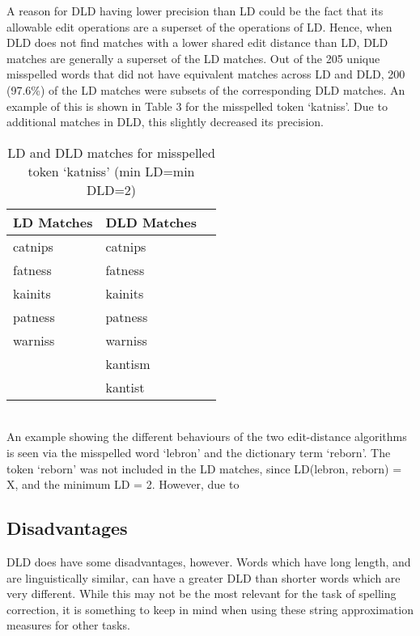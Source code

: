 \documentclass[11pt]{article}
\begin{document}
A reason for DLD having lower precision than LD could be the fact that its allowable edit operations are a superset of the operations of LD. Hence, when DLD does not find matches with a lower shared edit distance than LD, DLD matches are generally a superset of the LD matches. Out of the 205 unique misspelled words that did not have equivalent matches across LD and DLD, 200 (97.6\%) of the LD matches were subsets of the corresponding DLD matches. An example of this is shown in Table 3 for the misspelled token `katniss'. Due to additional matches in DLD, this slightly decreased its precision.
\begin{table}
\begin{center}
\begin{tabular}{ |l|l|l| }
\hline
LD Matches & DLD Matches \\
\hline
catnips & catnips\\
fatness & fatness\\ 
kainits & kainits\\
patness & patness\\
warniss & warniss\\
 & kantism\\
 & kantist\\
\hline
\end{tabular}
\caption{LD and DLD matches for misspelled token `katniss' (min LD=min DLD=2)}\label{table3}
\end{center}
\end{table}
\\

An example showing the different behaviours of the two edit-distance algorithms is seen via the misspelled word `lebron' and the dictionary term `reborn'. The token `reborn' was not included in the LD matches, since LD(lebron, reborn) = X, and the minimum LD = 2. However, due to 

\subsection{Disadvantages}
DLD does have some disadvantages, however. Words which have long length, and are linguistically similar, can have a greater DLD than shorter words which are very different. While this may not be the most relevant for the task of spelling correction, it is something to keep in mind when using these string approximation measures for other tasks.
\end{document}
